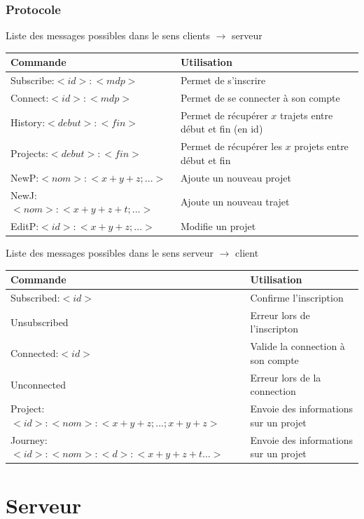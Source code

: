 \documentclass[a4paper, 11pt]{report}
\begin{document}
\subsection{Protocole}
	\begin{center}
		Liste des messages possibles dans le sens clients $\rightarrow$ serveur
		\par
		\begin{tabular}{|l|l|}
			\hline
			Commande & Utilisation\\
			\hline
			Subscribe:$<id>:<mdp>$ & Permet de s'inscrire\\
			\hline
			Connect:$<id>:<mdp>$ & Permet de se connecter à son compte\\
			\hline
			\hline
			History:$<debut>:<fin>$ & Permet de récupérer $x$ trajets entre début et fin (en id)\\
			\hline
			Projects:$<debut>:<fin>$ & Permet de récupérer les $x$ projets entre début et fin\\
			\hline
			\hline
			NewP:$<nom>:<x+y+z;...>$ & Ajoute un nouveau projet\\
			\hline
			NewJ:$<nom>:<x+y+z+t;...>$ & Ajoute un nouveau trajet\\
			\hline
			EditP:$<id>:<x+y+z;...>$ & Modifie un projet\\
			\hline
		\end{tabular}
	\end{center}
	\begin{center}
		Liste des messages possibles dans le sens serveur $\rightarrow$ client
		\par
		\begin{tabular}{|l|l|}
			\hline
			Commande & Utilisation\\
			\hline
			Subscribed:$<id>$ & Confirme l'inscription \\
			\hline
			Unsubscribed & Erreur lors de l'inscripton \\
			\hline
			Connected:$<id>$ & Valide la connection à son compte\\
			\hline
			Unconnected & Erreur lors de la connection \\
			\hline
			\hline
			Project:$<id>:<nom>:<x+y+z;...;x+y+z>$ & Envoie des informations sur un projet\\
			\hline
			Journey:$<id>:<nom>:<d>:<x+y+z+t...>$ & Envoie des informations sur un projet\\
			\hline
		\end{tabular}
	\end{center}
\chapter{Serveur}
\end{document}
